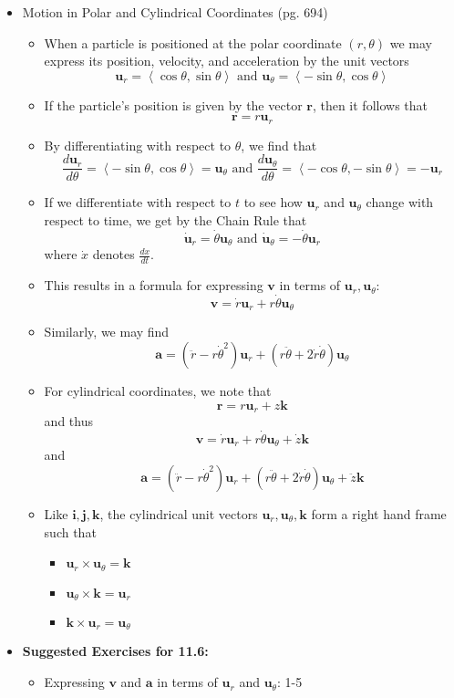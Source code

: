 \documentclass[12pt]{article}
\theoremstyle{plain}
\theoremstyle{definition}
\theoremstyle{remark}
\newcommand{\vect}[1]{\mathbf{#1}}
\newcommand{\veci}{\mathbf{i}}
\newcommand{\vecj}{\mathbf{j}}
\newcommand{\veck}{\mathbf{k}}
\begin{document}
\begin{itemize}
	\item Motion in Polar and Cylindrical Coordinates (pg. 694)
	
		\begin{itemize}
		\item When a particle is positioned at the polar coordinate $(r,\theta)$ we may express its position, velocity, and acceleration by the unit vectors \[\vect{u}_r = \left<\cos\theta,\sin\theta\right> \text{ and } \vect{u}_\theta = \left<-\sin\theta,\cos\theta\right>\]
		\item If the particle's position is given by the vector $\vect{r}$, then it follows that \[\vect{r} = r\vect{u}_r\]
		\item By differentiating with respect to $\theta$, we find that \[\frac{d\vect{u}_r}{d\theta} = \left<-\sin\theta,\cos\theta\right> = \vect{u}_\theta \text{ and } \frac{d\vect{u}_\theta}{d\theta} = \left<-\cos\theta,-\sin\theta\right> = -\vect{u}_r\]
		\item If we differentiate with respect to $t$ to see how $\vect{u}_r$ and $\vect{u}_\theta$ change with respect to time, we get by the Chain Rule that \[\dot{\vect{u}}_r = \dot{\theta}\vect{u}_\theta \text{ and } \dot{\vect{u}}_\theta = -\dot\theta\vect{u}_r\] where $\dot x$ denotes $\frac{dx}{dt}$.
		\item This results in a formula for expressing $\vect{v}$ in terms of $\vect{u}_r,\vect{u}_\theta$: \[\vect{v} = \dot{r}\vect{u}_r + r\dot\theta\vect{u}_\theta\]
		\item Similarly, we may find \[\vect{a} = (\ddot{r} - r\dot\theta^2)\vect{u}_r + (r\ddot\theta + 2\dot{r}\dot\theta)\vect{u}_\theta\]
		\item For cylindrical coordinates, we note that \[\vect{r} = r\vect{u}_r + z\veck\] and thus \[\vect{v} = \dot{r}\vect{u}_r + r\dot\theta\vect{u}_\theta + \dot{z}\veck\] and \[\vect{a} = (\ddot{r} - r\dot\theta^2)\vect{u}_r + (r\ddot\theta + 2\dot{r}\dot\theta)\vect{u}_\theta+\ddot{z}\veck\]
		\item Like $\veci,\vecj,\veck$, the cylindrical unit vectors $\vect{u}_r,\vect{u}_\theta,\veck$ form a right hand frame such that
			\begin{itemize}
			\item $\vect{u}_r \times \vect{u}_\theta = \veck$
			\item $\vect{u}_\theta \times \veck = \vect{u}_r$
			\item $\veck \times \vect{u}_r = \vect{u}_\theta$
			\end{itemize}
		\end{itemize}
	
	\item \textbf{ Suggested Exercises for 11.6:}
	
		\begin{itemize}
		\item Expressing $\vect{v}$ and $\vect{a}$ in terms of $\vect{u}_r$ and $\vect{u}_\theta$: 1-5
		\end{itemize}
	\end{itemize}
	
\end{document}
